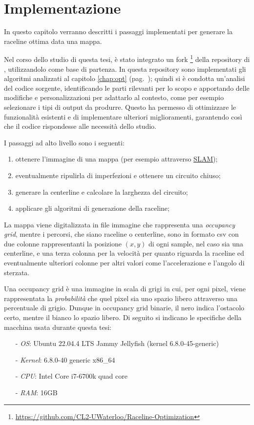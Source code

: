 
\chapter{Implementazione}
\label{chap:impl}
In questo capitolo verranno descritti i passaggi implementati per generare la raceline ottima data una
mappa.

Nel corso dello studio di questa tesi, è stato integrato un fork
\footnote{\url{https://github.com/CL2-UWaterloo/Raceline-Optimization}} della repository di
\cite{christ2021time}, utilizzandolo come base di partenza. In questa repository sono implementati gli
algoritmi analizzati al capitolo \ref{chap:opt} (pag.~\pageref{chap:opt}); quindi si è condotta
un'analisi del codice sorgente, identificando le parti rilevanti per lo scopo e apportando delle
modifiche e personalizzazioni per adattarlo al contesto, come per esempio selezionare i tipi di output da
produrre. Questo ha permesso di ottimizzare le funzionalità esistenti e di implementare ulteriori
miglioramenti, garantendo così che il codice rispondesse alle necessità dello studio.

\bigskip
\noindent I passaggi ad alto livello sono i seguenti:
\begin{enumerate}
	\item ottenere l'immagine di una mappa (per esempio attraverso \hyperref[par:slam]{SLAM});
	\item eventualmente ripulirla di imperfezioni e ottenere un circuito chiuso; 
	\item generare la centerline e calcolare la larghezza del circuito;
	\item applicare gli algoritmi di generazione della raceline;
\end{enumerate}
La mappa viene digitalizzata in file immagine che rappresenta una \textit{occupancy grid}, mentre i
percorsi, che siano raceline o centerline, sono in formato csv con due colonne rappresentanti la
posizione $(x,y)$ di ogni sample, nel caso sia una centerline, e una terza colonna per la velocità per
quanto riguarda la raceline ed eventualmente ulteriori colonne per altri valori come l'accelerazione e
l'angolo di sterzata.

Una occupancy grid è una immagine in scala di grigi in cui, per ogni pixel, viene rappresentata la
\textit{probabilità} che quel pixel sia uno spazio libero attraverso una percentuale di grigio. Dunque in
occupancy grid binarie, il nero indica l'ostacolo certo, mentre il bianco lo spazio libero.
\newpage
Di seguito si indicano le specifiche della macchina usata durante questa tesi:
\begin{itemize}
	\item[-] \textit{OS}: Ubuntu 22.04.4 LTS Jammy Jellyfish (kernel 6.8.0-45-generic)
	\item[-] \textit{Kernel}: 6.8.0-40 generic x86\_64
	\item[-] \textit{CPU}: Intel Core i7-6700k quad core
	\item[-] \textit{RAM}: 16GB
\end{itemize}

